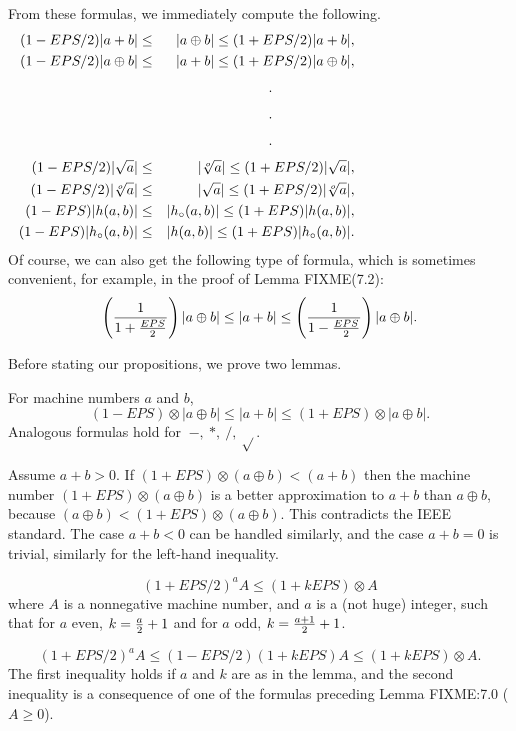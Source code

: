  
From these formulas, we immediately compute the following.
\begin{eqnarray*}
(1 - EPS/2) |a + b| &\leq& |a \oplus b| 
\leq (1 + EPS/2) |a+b|, \\ 
  (1 - EPS/2) |a \oplus b|& \leq& |a + b| 
\leq (1 + EPS/2) |a \oplus b|,\\
\noalign{\vskip4pt}
\noalign{\hfil .\hfil }  \noalign{\vskip4pt}
\noalign{\hfil .\hfil } \noalign{\vskip4pt}
\noalign{\hfil .\hfil } \noalign{\vskip4pt}
(1 - EPS/2) |\sqrt a| &\leq&  |\root o \of a| 
\leq (1 + EPS/2) |\sqrt a|, \\ (1 - EPS/2) |\root o \of a|&\leq&  |\sqrt a| 
\leq (1 + EPS/2) |\root o \of a|, \\  (1 - EPS) |h(a,b)| &\leq&  |h_\circ (a,b)| 
\leq (1 + EPS) |h(a,b)|, \\  (1 - EPS) |h_\circ (a,b)| &\leq& |h(a,b)| 
\leq (1 + EPS) |h_\circ (a,b)|.
\end{eqnarray*}
Of course, we can also get the following type of formula, which is sometimes convenient,
 for example, in the proof of Lemma FIXME(7.2):
$$\left({1 \over {1 + {EPS \over 2}}}\right) |a \oplus b| \leq |a + b| 
\leq \left({1 \over {1 - {EPS \over 2}}}\right) |a \oplus b|.$$

Before stating our propositions, we prove two lemmas.

For machine numbers $a$ and $b${\rm ,}
$$(1 - EPS) \otimes |a \oplus b| \le |a + b| \le (1 + EPS) \otimes |a \oplus b|.$$
 Analogous formulas hold for $\ -,\ *,\ /,\ \sqrt{}$.
\endproclaim

Assume $a+b > 0$.  
If $(1+EPS) \otimes (a \oplus b) < (a+b)$ then the machine number 
$(1+EPS) \otimes (a \oplus b)$ is a better approximation to $a+b$ than $a \oplus b$, because $(a \oplus b) 
< (1+EPS) \otimes (a \oplus b)$.  This contradicts the IEEE standard.  The case $a+b < 0$ can be handled similarly, and the
case $a+b = 0$ is trivial, similarly for the left-hand inequality.
\enddemo

 $$(1 + EPS/2)^a A \le (1 + k EPS) \otimes A$$ 
 where $A$ is a nonnegative machine number{\rm ,} and $a$ is a {\rm (}\/not huge\/{\rm )} integer{\rm ,} such that
for $a$ even{\rm ,} $k = {a \over 2} + 1$ and  for $a$ odd, $k = {a+1 \over 2} + 1$. 
\endproclaim

$$(1 + EPS/2)^a A\le (1 - EPS/2)(1 + k EPS) A \le (1 + k EPS) \otimes A.$$ 
The first inequality holds if $a$ and $k$ are as in the lemma, and the second inequality is a consequence of one of the
formulas preceding Lemma FIXME:7.0 ($A \ge 0$). \enddemo
 
